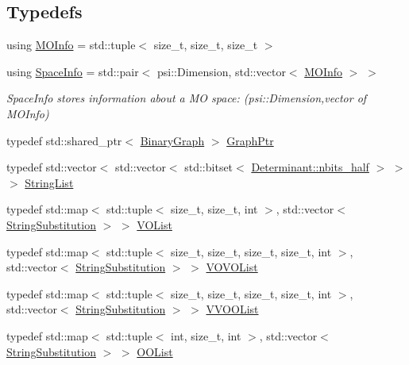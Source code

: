 \subsection*{Typedefs}
\begin{DoxyCompactItemize}
\item 
using \mbox{\hyperlink{namespaceforte_aba0d18f1ff36b478ecf2db631246e120}{M\+O\+Info}} = std\+::tuple$<$ size\+\_\+t, size\+\_\+t, size\+\_\+t $>$
\item 
using \mbox{\hyperlink{namespaceforte_a5409f5af2d60d63681bfac1017b8e226}{Space\+Info}} = std\+::pair$<$ psi\+::\+Dimension, std\+::vector$<$ \mbox{\hyperlink{namespaceforte_aba0d18f1ff36b478ecf2db631246e120}{M\+O\+Info}} $>$ $>$
\begin{DoxyCompactList}\small\item\em Space\+Info stores information about a MO space\+: (psi\+::\+Dimension,vector of M\+O\+Info) \end{DoxyCompactList}\item 
typedef std\+::shared\+\_\+ptr$<$ \mbox{\hyperlink{classforte_1_1_binary_graph}{Binary\+Graph}} $>$ \mbox{\hyperlink{namespaceforte_a4669cbddcd761bcaee151bc7cff6c444}{Graph\+Ptr}}
\item 
typedef std\+::vector$<$ std\+::vector$<$ std\+::bitset$<$ \mbox{\hyperlink{classforte_1_1_determinant_impl_ac8d2a64c2fb785ccb79b1cecc553d63d}{Determinant\+::nbits\+\_\+half}} $>$ $>$ $>$ \mbox{\hyperlink{namespaceforte_aca998efba411157767fc84335aaa3abc}{String\+List}}
\item 
typedef std\+::map$<$ std\+::tuple$<$ size\+\_\+t, size\+\_\+t, int $>$, std\+::vector$<$ \mbox{\hyperlink{structforte_1_1_string_substitution}{String\+Substitution}} $>$ $>$ \mbox{\hyperlink{namespaceforte_a06d02b08c65b4a59d056aa83839110d3}{V\+O\+List}}
\item 
typedef std\+::map$<$ std\+::tuple$<$ size\+\_\+t, size\+\_\+t, size\+\_\+t, size\+\_\+t, int $>$, std\+::vector$<$ \mbox{\hyperlink{structforte_1_1_string_substitution}{String\+Substitution}} $>$ $>$ \mbox{\hyperlink{namespaceforte_a1d7711c26aa3c0c41f36ca87c42aad43}{V\+O\+V\+O\+List}}
\item 
typedef std\+::map$<$ std\+::tuple$<$ size\+\_\+t, size\+\_\+t, size\+\_\+t, size\+\_\+t, int $>$, std\+::vector$<$ \mbox{\hyperlink{structforte_1_1_string_substitution}{String\+Substitution}} $>$ $>$ \mbox{\hyperlink{namespaceforte_a2554bbadd74253084e41d64216f6da95}{V\+V\+O\+O\+List}}
\item 
typedef std\+::map$<$ std\+::tuple$<$ int, size\+\_\+t, int $>$, std\+::vector$<$ \mbox{\hyperlink{structforte_1_1_string_substitution}{String\+Substitution}} $>$ $>$ \mbox{\hyperlink{namespaceforte_a2b4fd5e252f6e15214db23a259203983}{O\+O\+List}}

\end{DoxyCompactItemize}

